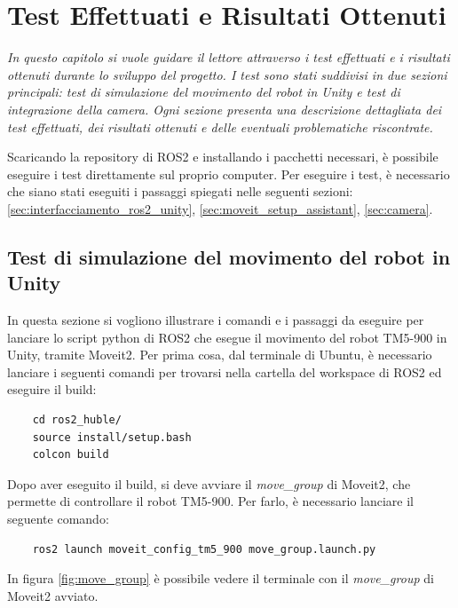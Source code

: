 \documentclass[11pt]{report}
\begin{document}
\chapter{Test Effettuati e Risultati Ottenuti}
\label{cap:Test}
\textit{In questo capitolo si vuole guidare il lettore attraverso i test effettuati e i risultati ottenuti durante lo sviluppo del progetto. I test sono stati suddivisi in due sezioni principali: test di simulazione del movimento del robot in Unity e test di integrazione della camera. Ogni sezione presenta una descrizione dettagliata dei test effettuati, dei risultati ottenuti e delle eventuali problematiche riscontrate.}

Scaricando la repository di ROS2 \cite{Repository_ROS2} e installando i pacchetti necessari, è possibile eseguire i test direttamente sul proprio computer. Per eseguire i test, è necessario che siano stati eseguiti i passaggi spiegati nelle seguenti sezioni: \ref{sec:interfacciamento_ros2_unity}, \ref{sec:moveit_setup_assistant}, \ref{sec:camera}.

\section{Test di simulazione del movimento del robot in Unity}
\label{sec:Test_simulazione}    
In questa sezione si vogliono illustrare i comandi e i passaggi da eseguire per lanciare lo script python di ROS2 che esegue il movimento del robot TM5-900 in Unity, tramite Moveit2. 
\newline
Per prima cosa, dal terminale di Ubuntu, è necessario lanciare i seguenti comandi per trovarsi nella cartella del workspace di ROS2 ed eseguire il build:

\begin{verbatim}
    cd ros2_huble/
    source install/setup.bash
    colcon build 
\end{verbatim}

Dopo aver eseguito il build, si deve avviare il \textit{move\_group} di Moveit2, che permette di controllare il robot TM5-900. Per farlo, è necessario lanciare il seguente comando:
\begin{verbatim}
    ros2 launch moveit_config_tm5_900 move_group.launch.py
\end{verbatim}

In figura \ref{fig:move_group} è possibile vedere il terminale con il \textit{move\_group} di Moveit2 avviato. 
\end{document}
